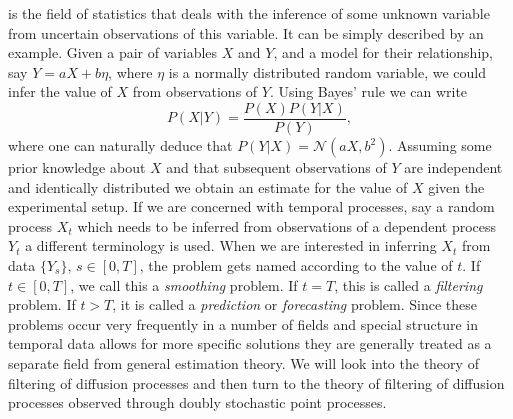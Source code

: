  is the field of statistics that deals with the inference of some unknown variable from uncertain observations of this variable. It can be simply described by an example. Given a pair of variables $X$ and $Y$, and a model for their relationship, say $Y = aX + b\eta$, where $\eta$ is a normally distributed random variable, we could infer the value of $X$ from observations of $Y$. Using Bayes' rule we can write
\[
P(X|Y) = \frac{P(X)P(Y|X)}{P(Y)},
\]
where one can naturally deduce that $P(Y|X) = \mathcal{N}(aX,b^2)$. Assuming some prior knowledge about $X$ and that subsequent observations of $Y$ are independent and identically distributed we obtain an estimate for the value of $X$ given the experimental setup. If we are concerned with temporal processes, say a random process $X_t$ which needs to be inferred from observations of a dependent process $Y_t$ a different terminology is used. When we are interested in inferring $X_t$ from data $\{Y_s\},\,s \in [0,T]$, the problem gets named according to the value of $t$. If $t \in [0,T]$, we call this a \emph{smoothing} problem. If $t = T$, this is called a \emph{filtering} problem. If $t>T$, it is called a \emph{prediction} or \emph{forecasting} problem. Since these problems occur very frequently in a number of fields and special structure in temporal data allows for more specific solutions they are generally treated as a separate field from general estimation theory. We will look into the theory of filtering of diffusion processes and then turn to the theory of filtering of diffusion processes observed through doubly stochastic point processes.

